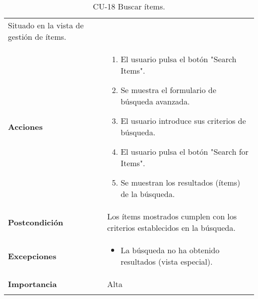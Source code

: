 \begin{longtable}[]{@{}ll@{}}
\begin{minipage}[t]{0.69\columnwidth}
Situado en la vista de gestión de ítems.\strut
\end{minipage}\tabularnewline
\begin{minipage}[t]{0.25\columnwidth}\raggedright
\textbf{Acciones}\strut
\end{minipage} & \begin{minipage}[t]{0.69\columnwidth}\raggedright
\begin{enumerate}
\def\labelenumi{\arabic{enumi}.}
\tightlist
\item
  El usuario pulsa el botón "Search Items".
\item
  Se muestra el formulario de búsqueda avanzada.
\item
  El usuario introduce sus criterios de búsqueda.
\item
  El usuario pulsa el botón "Search for Items".
\item
  Se muestran los resultados (ítems) de la búsqueda.
\end{enumerate}\strut
\end{minipage}\tabularnewline
\begin{minipage}[t]{0.25\columnwidth}\raggedright
\textbf{Postcondición}\strut
\end{minipage} & \begin{minipage}[t]{0.69\columnwidth}\raggedright
Los ítems mostrados cumplen con los criterios establecidos en la
búsqueda.\strut
\end{minipage}\tabularnewline
\begin{minipage}[t]{0.25\columnwidth}\raggedright
\textbf{Excepciones}\strut
\end{minipage} & \begin{minipage}[t]{0.69\columnwidth}\raggedright
\begin{itemize}
\tightlist
\item
  La búsqueda no ha obtenido resultados (vista especial).
\end{itemize}\strut
\end{minipage}\tabularnewline
\begin{minipage}[t]{0.25\columnwidth}\raggedright
\textbf{Importancia}\strut
\end{minipage} & \begin{minipage}[t]{0.69\columnwidth}\raggedright
Alta\strut
\end{minipage}\tabularnewline
\bottomrule
\caption{CU-18 Buscar ítems.}
\end{longtable}

